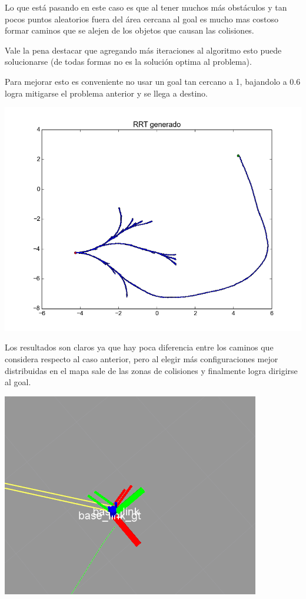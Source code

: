 Lo que está pasando en este caso es que al tener muchos más obstáculos y tan pocos puntos aleatorios fuera del área cercana al goal es mucho mas costoso formar caminos que se alejen de los objetos que causan las colisiones. 

Vale la pena destacar que agregando más iteraciones al algoritmo esto  puede solucionarse (de todas formas no es la solución optima al problema).

Para mejorar esto es conveniente no usar un goal tan cercano a 1, bajandolo a 0.6 logra mitigarse el problema anterior y se llega a destino.

\includegraphics[scale=0.5]{tp4_imagenes/informe_goal_bias_dificil_06.png}

Los resultados son claros ya que hay poca diferencia entre los caminos que considera respecto al caso anterior, pero al elegir más configuraciones mejor distribuidas en el mapa sale de las zonas de colisiones y finalmente logra dirigirse al goal.

\includegraphics[scale=0.5]{tp4_imagenes/informe_goal_bias_dificil_06_rviz1.png}

